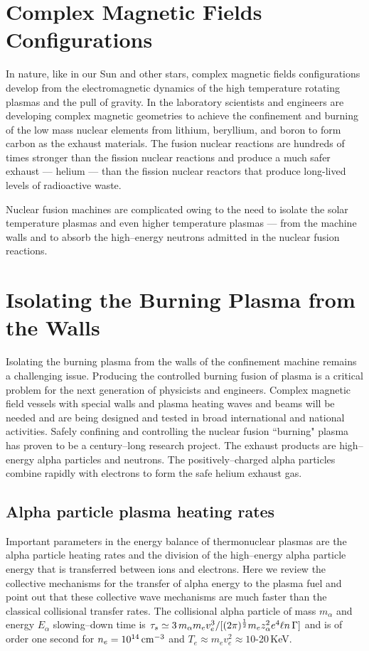 \documentclass[a4paper,openany,12pt]{report}
\begin{document}
\section{Complex Magnetic Fields Configurations}

In nature, like in our Sun and other stars, complex magnetic fields configurations develop from the electromagnetic dynamics of the high temperature rotating plasmas and the pull of gravity. In the laboratory scientists and engineers are developing complex magnetic geometries to achieve the confinement and burning of the low mass nuclear elements from lithium, beryllium, and boron to form carbon as the exhaust materials. The fusion nuclear reactions are hundreds of times stronger than the fission nuclear reactions and produce a much safer exhaust --- helium --- than the fission nuclear reactors that produce long-lived levels of radioactive waste. 

Nuclear fusion machines are complicated owing to the need to isolate the solar temperature plasmas and even higher temperature plasmas --- from the machine walls and to absorb the high--energy neutrons admitted in the nuclear fusion reactions.

\section{Isolating the Burning Plasma from the Walls}

Isolating the burning plasma from the walls of the confinement machine remains a challenging issue. Producing the controlled burning fusion of plasma is a critical problem for the next generation of physicists and engineers. Complex magnetic field vessels with special walls and plasma heating waves and beams will be needed and are being designed and tested in broad international and national activities. Safely confining and controlling the nuclear fusion ``burning" plasma has proven to be a century--long research project. The exhaust products are high--energy alpha particles and neutrons. The positively--charged alpha particles combine rapidly with electrons to form the safe helium exhaust gas.

\subsection{Alpha particle plasma heating rates}

Important parameters in the energy balance of thermonuclear plasmas are the alpha particle heating rates and the division of the high--energy alpha particle energy that is transferred between ions and electrons. Here we review the collective mechanisms for the transfer of alpha energy to the plasma fuel and point out that these collective wave mechanisms are much faster than the classical collisional transfer rates. The collisional alpha particle of mass $m_\alpha$ and energy $E_\alpha$ slowing--down time is $\tau_s\simeq 3\,m_\alpha m_e v^3_e/[(2\pi)^{1\over2} m_e z_\alpha^2 e^4\ell n\,\Gamma]$ and is of order one second for $n_e = 10^{14}\,\rm cm^{-3}$ and $T_e\approx m_e v_e^2\approx 10$-20$\,$KeV.
\end{document}

